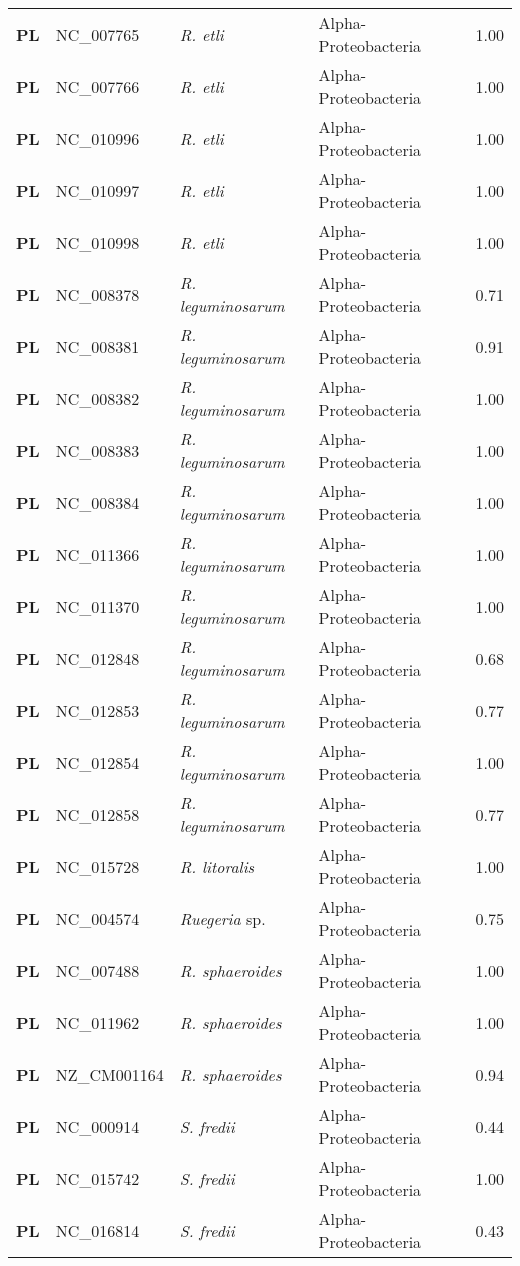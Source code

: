 \begin{adjustwidth}{-3cm}{2cm}
{\begin{supertabular}{>{\bfseries}l|p{0.1\textwidth}p{0.14\textwidth}l|l}
PL & NC\_007765 & \textit{R. etli} & Alpha-Proteobacteria & 1.00\\
PL & NC\_007766 & \textit{R. etli} & Alpha-Proteobacteria & 1.00\\
PL & NC\_010996 & \textit{R. etli} & Alpha-Proteobacteria & 1.00\\
PL & NC\_010997 & \textit{R. etli} & Alpha-Proteobacteria & 1.00\\
PL & NC\_010998 & \textit{R. etli} & Alpha-Proteobacteria & 1.00\\
PL & NC\_008378 & \textit{R. leguminosarum} & Alpha-Proteobacteria & 0.71\\
PL & NC\_008381 & \textit{R. leguminosarum} & Alpha-Proteobacteria & 0.91\\
PL & NC\_008382 & \textit{R. leguminosarum} & Alpha-Proteobacteria & 1.00\\
PL & NC\_008383 & \textit{R. leguminosarum} & Alpha-Proteobacteria & 1.00\\
PL & NC\_008384 & \textit{R. leguminosarum} & Alpha-Proteobacteria & 1.00\\
PL & NC\_011366 & \textit{R. leguminosarum} & Alpha-Proteobacteria & 1.00\\
PL & NC\_011370 & \textit{R. leguminosarum} & Alpha-Proteobacteria & 1.00\\
PL & NC\_012848 & \textit{R. leguminosarum} & Alpha-Proteobacteria & 0.68\\
PL & NC\_012853 & \textit{R. leguminosarum} & Alpha-Proteobacteria & 0.77\\
PL & NC\_012854 & \textit{R. leguminosarum} & Alpha-Proteobacteria & 1.00\\
PL & NC\_012858 & \textit{R. leguminosarum} & Alpha-Proteobacteria & 0.77\\
PL & NC\_015728 & \textit{R. litoralis} & Alpha-Proteobacteria & 1.00\\
PL & NC\_004574 & \textit{Ruegeria} sp. & Alpha-Proteobacteria & 0.75\\
PL & NC\_007488 & \textit{R. sphaeroides} & Alpha-Proteobacteria & 1.00\\
PL & NC\_011962 & \textit{R. sphaeroides} & Alpha-Proteobacteria & 1.00\\
PL & NZ\_CM001164 & \textit{R. sphaeroides} & Alpha-Proteobacteria & 0.94\\
PL & NC\_000914 & \textit{S. fredii} & Alpha-Proteobacteria & 0.44\\
PL & NC\_015742 & \textit{S. fredii} & Alpha-Proteobacteria & 1.00\\
PL & NC\_016814 & \textit{S. fredii} & Alpha-Proteobacteria & 0.43\\

\end{supertabular}}
\end{adjustwidth}
